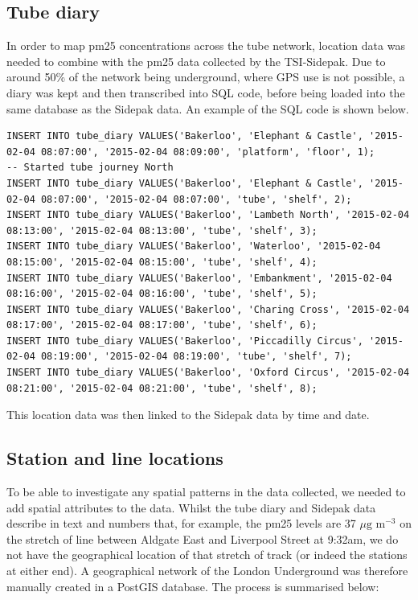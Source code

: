 \subsection{Tube diary}
\label{tube_diary}
In order to map \gls{pm25} concentrations across the tube network, location data was needed to combine with the \gls{pm25} data collected by the TSI-Sidepak. Due to around 50\% of the network being underground, where GPS use is not possible, a diary was kept and then transcribed into SQL code, before being loaded into the same database as the Sidepak data. An example of the SQL code is shown below.

\begin{lstlisting}
INSERT INTO tube_diary VALUES('Bakerloo', 'Elephant & Castle', '2015-02-04 08:07:00', '2015-02-04 08:09:00', 'platform', 'floor', 1);
-- Started tube journey North
INSERT INTO tube_diary VALUES('Bakerloo', 'Elephant & Castle', '2015-02-04 08:07:00', '2015-02-04 08:07:00', 'tube', 'shelf', 2);
INSERT INTO tube_diary VALUES('Bakerloo', 'Lambeth North', '2015-02-04 08:13:00', '2015-02-04 08:13:00', 'tube', 'shelf', 3);
INSERT INTO tube_diary VALUES('Bakerloo', 'Waterloo', '2015-02-04 08:15:00', '2015-02-04 08:15:00', 'tube', 'shelf', 4);
INSERT INTO tube_diary VALUES('Bakerloo', 'Embankment', '2015-02-04 08:16:00', '2015-02-04 08:16:00', 'tube', 'shelf', 5);
INSERT INTO tube_diary VALUES('Bakerloo', 'Charing Cross', '2015-02-04 08:17:00', '2015-02-04 08:17:00', 'tube', 'shelf', 6);
INSERT INTO tube_diary VALUES('Bakerloo', 'Piccadilly Circus', '2015-02-04 08:19:00', '2015-02-04 08:19:00', 'tube', 'shelf', 7);
INSERT INTO tube_diary VALUES('Bakerloo', 'Oxford Circus', '2015-02-04 08:21:00', '2015-02-04 08:21:00', 'tube', 'shelf', 8);
\end{lstlisting}

This location data was then linked to the Sidepak data by time and date.

\subsection{Station and line locations}
To be able to investigate any spatial patterns in the data collected, we needed to add spatial attributes to the data. Whilst the tube diary and Sidepak data describe in text and numbers that, for example, the \gls{pm25} levels are 37 $\mu \text{g m}^{-3}$ on the stretch of line between Aldgate East and Liverpool Street at 9:32am, we do not have the geographical location of that stretch of track (or indeed the stations at either end). A geographical network of the London Underground was therefore manually created in a PostGIS database. The process is summarised below:

